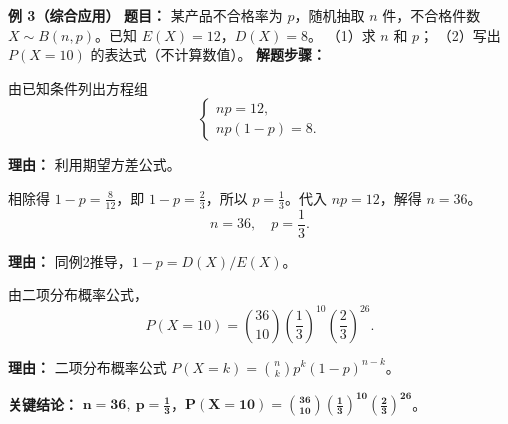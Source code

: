 \begin{examplebox}
	\medskip
	\textbf{\textcolor{CExample}{例 3（综合应用）}}
	\textbf{\textcolor{CExample}{题目：}}
	某产品不合格率为 $p$，随机抽取 $n$ 件，不合格件数 $X\sim B(n,p)$。已知 $E(X)=12$，$D(X)=8$。 （1）求 $n$ 和 $p$； （2）写出 $P(X=10)$ 的表达式（不计算数值）。
	\textbf{\textcolor{CExample}{解题步骤：}}
	\begin{description}[style=nextline, leftmargin=2.8em, labelsep=0.5em, itemsep=0.45em]
		\item[\textbf{第一步（列方程组）：}]
			由已知条件列出方程组
			\[
				\begin{cases}
					np = 12,\\ np(1-p) = 8.
			\end{cases}
			\]
			\par\textbf{理由：} 利用期望方差公式。
		\item[\textbf{第二步（解参数）：}]
			相除得 $1-p = \frac{8}{12}$，即 $1-p = \frac{2}{3}$，所以 $p=\frac{1}{3}$。代入 $np=12$，解得 $n=36$。
			\[
				n=36,\quad p=\frac{1}{3}.
			\]
			\par\textbf{理由：} 同例2推导，$1-p = D(X)/E(X)$。
		\item[\textbf{第三步（写概率）：}]
			由二项分布概率公式，
			\[
				P(X=10)=\binom{36}{10}\left(\frac{1}{3}\right)^{10}\left(\frac{2}{3}\right)^{26}.
			\]
			\par\textbf{理由：} 二项分布概率公式 $P(X=k)=\binom{n}{k}p^k(1-p)^{n-k}$。
	\end{description}
	\textbf{\textcolor{CExample}{关键结论：}}
	$\mathbf{n=36,\ p=\frac{1}{3}}$，$\mathbf{P(X=10)=\binom{36}{10}\left(\frac{1}{3}\right)^{10}\left(\frac{2}{3}\right)^{26}}$。
\end{examplebox}
